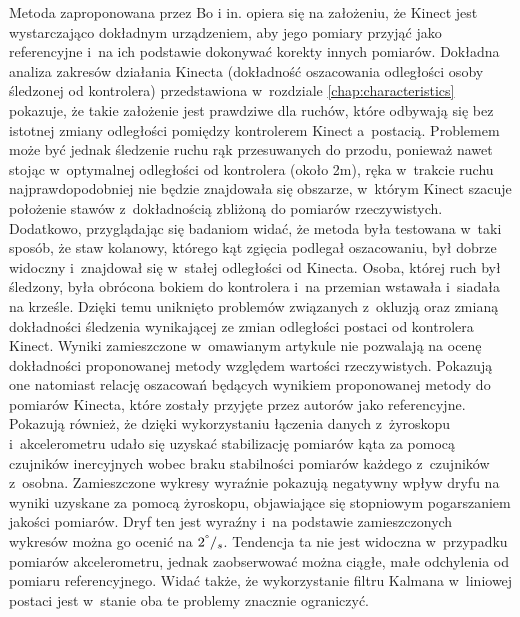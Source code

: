 Metoda zaproponowana przez Bo i in. opiera się na założeniu, że Kinect jest wystarczająco dokładnym urządzeniem, aby jego pomiary przyjąć jako referencyjne i~na ich podstawie dokonywać korekty innych pomiarów. Dokładna analiza zakresów działania Kinecta (dokładność oszacowania odległości osoby śledzonej od kontrolera) przedstawiona w~rozdziale \ref{chap:characteristics} pokazuje, że takie założenie jest prawdziwe dla ruchów, które odbywają się bez istotnej zmiany odległości pomiędzy kontrolerem Kinect a~postacią. Problemem może być jednak śledzenie ruchu rąk przesuwanych do przodu, ponieważ nawet stojąc w~optymalnej odległości od kontrolera (około 2m), ręka w~trakcie ruchu najprawdopodobniej nie będzie znajdowała się obszarze, w~którym Kinect szacuje położenie stawów z~dokładnością zbliżoną do pomiarów rzeczywistych. Dodatkowo, przyglądając się badaniom widać, że metoda była testowana w~taki sposób, że staw kolanowy, którego kąt zgięcia podlegał oszacowaniu, był dobrze widoczny i~znajdował się w~stałej odległości od Kinecta. Osoba, której ruch był śledzony, była obrócona bokiem do kontrolera i~na przemian wstawała i~siadała na krześle. Dzięki temu uniknięto problemów związanych z~okluzją oraz zmianą dokładności śledzenia wynikającej ze zmian odległości postaci od kontrolera Kinect.																																																	
Wyniki zamieszczone w~omawianym artykule \cite{Bo2011a} nie pozwalają na ocenę dokładności proponowanej metody względem wartości rzeczywistych. Pokazują one natomiast relację oszacowań będących wynikiem proponowanej metody do pomiarów Kinecta, które zostały przyjęte przez autorów jako referencyjne. Pokazują również, że dzięki wykorzystaniu łączenia danych z~żyroskopu i~akcelerometru udało się uzyskać stabilizację pomiarów kąta za pomocą czujników inercyjnych wobec braku stabilności pomiarów każdego z~czujników z~osobna. Zamieszczone wykresy wyraźnie pokazują negatywny wpływ dryfu na wyniki uzyskane za pomocą żyroskopu, objawiające się stopniowym pogarszaniem jakości pomiarów. Dryf ten jest wyraźny i~na podstawie zamieszczonych wykresów można go ocenić na $2^\degree/_s$. Tendencja ta nie jest widoczna w~przypadku pomiarów akcelerometru, jednak zaobserwować można ciągłe, małe odchylenia od pomiaru referencyjnego. Widać także, że wykorzystanie filtru Kalmana w~liniowej postaci jest w~stanie oba te problemy znacznie ograniczyć.																																																	
